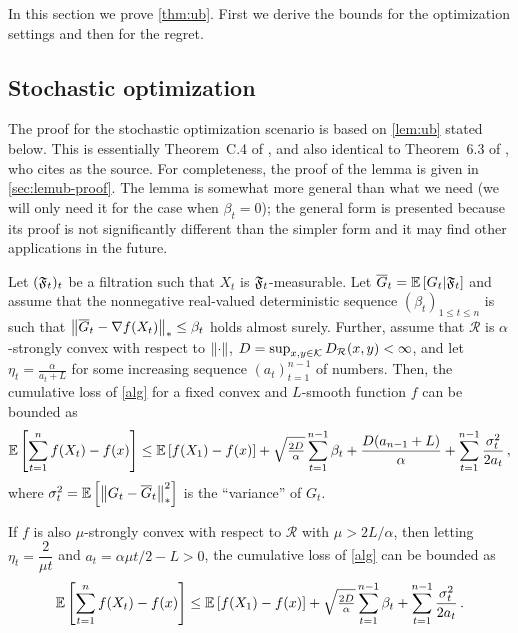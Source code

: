 
In this section we prove \cref{thm:ub}. First we derive the bounds for the optimization settings and then for the regret. 

\subsection{Stochastic optimization}

The proof for the stochastic optimization scenario is based on \cref{lem:ub} stated below.
This is essentially Theorem~C.4 of \citet{MahdaviPhd:2014}, and also identical to Theorem~6.3 of \citet{Bu:Convex14}, who cites \citet{Dekel:minibatch12} as the source. For completeness, the proof of the lemma is given in \cref{sec:lemub-proof}.
The lemma is somewhat more general than what we need (we will only need it for the case when $\beta_t=0$); 
the general form is presented because its proof is not significantly different than the simpler form and it may find
other applications in the future.
\begin{lemma}
\label{lem:ub}
Let $({\mathfrak{F}}_t)_{t}$ be a filtration such that $X_t$ is ${{\mathfrak{F}}}_t$-measurable.
Let $\overline G_t = \mathbb{E}\left[G_t|{{\mathfrak{F}}}_t\right]$
and assume that the nonnegative real-valued deterministic sequence $(\beta_t)_{1\le t\le n}$ is such that
$\left\|\overline G_t - \nabla {f}(X_t)\right\|_* \le \beta_t$ holds almost surely.
Further, assume that $\mathcal{R}$ is $\alpha$-strongly convex with respect to $\left\|\cdot\right\|$, $D=\sup_{x,y\in \mathcal{K}} D_{\mathcal{R}}(x,y) < \infty$,  and let $\eta_t = \frac{\alpha}{a_t+L}$ for some increasing
sequence $(a_t)_{t=1}^{n-1}$ of numbers. Then, the cumulative loss of \cref{alg} for a fixed convex and $L$-smooth  function $f$ can be bounded as
\begin{align*}
\mathbb{E}\left[ \sum_{t=1}^n {f}(X_t) - {f}(x) \right]
\le 	 \mathbb{E}\left[{f}(X_1)-{f}(x)\right]+
  \sqrt{\tfrac{2D}{\alpha}} \sum_{t=1}^{n-1} \beta_t
 +\frac{D(a_{n-1}+L)}{\alpha} +
	  \sum_{t=1}^{n-1}\frac{\sigma_t^2}{2a_t}\,,
\end{align*}
where $\sigma_t^2 = \mathbb{E}\left[ \left\|G_t-\overline G_t\right\|_*^2\right]$ is the ``variance'' of $G_t$.

If ${{f}}$ is also $\mu$-strongly convex with respect to $\mathcal{R}$ with $\mu > 2L/\alpha$, then letting $\eta_t = \dfrac{2}{\mu t}$ and $a_t = \alpha \mu t/2-L > 0$, the cumulative loss of  \cref{alg} can be bounded as
\begin{align*}
 \mathbb{E}\left[ \sum_{t=1}^n {f}(X_t) - {f}(x) \right]
\le 	 \mathbb{E}\left[{f}(X_1)-{f}(x)\right]+
 \sqrt{\tfrac{2D}{\alpha}} \sum_{t=1}^{n-1} \beta_t
 +\sum_{t=1}^{n-1}\frac{\sigma_t^2}{2a_t}\,.
\end{align*}
\end{lemma}

